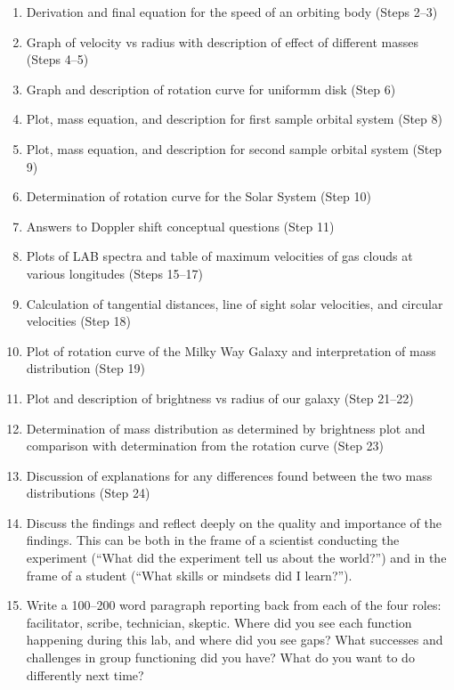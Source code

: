 \begin{enumerate}
	\item Derivation and final equation for the speed of an orbiting body (Steps 2--3)
	
	\item Graph of velocity vs radius with description of effect of different masses (Steps 4--5)
	
	\item Graph and description of rotation curve for uniformm disk (Step 6)
	
	\item Plot, mass equation, and description for first sample orbital system (Step 8)
	
	\item Plot, mass equation, and description for second sample orbital system (Step 9)
	
	\item Determination of rotation curve for the Solar System (Step 10)
	
	\item Answers to Doppler shift conceptual questions (Step 11)
	
	\item Plots of LAB spectra and table of maximum velocities of gas clouds at various longitudes (Steps 15--17)
	
	\item Calculation of tangential distances, line of sight solar velocities, and circular velocities (Step 18)
	
	\item Plot of rotation curve of the Milky Way Galaxy and interpretation of mass distribution (Step 19)
	
	\item Plot and description of brightness vs radius of our galaxy (Step 21--22)
	
	\item Determination of mass distribution as determined by brightness plot and comparison with determination from the rotation curve (Step 23)
	
	\item Discussion of explanations for any differences found between the two mass distributions (Step 24)
	
	\item Discuss the findings and reflect deeply on the quality and importance of the findings. This can
	be both in the frame of a scientist conducting the experiment (“What did the experiment tell us
	about the world?”) and in the frame of a student (“What skills or mindsets did I learn?”).
	
	\item Write a 100--200 word paragraph reporting back from each of the four roles: facilitator, scribe, technician, skeptic. Where did you see each function happening during this lab, and where did you see gaps? What successes and challenges in group functioning did you have? What do you want to do differently next time?
\end{enumerate}